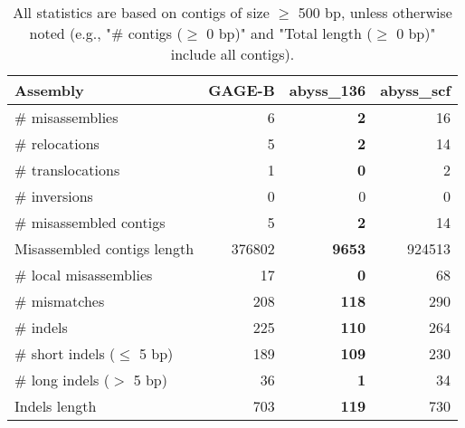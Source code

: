 \documentclass[12pt,a4paper]{article}
\begin{document}
\begin{table}[ht]
\begin{center}
\caption{All statistics are based on contigs of size $\geq$ 500 bp, unless otherwise noted (e.g., "\# contigs ($\geq$ 0 bp)" and "Total length ($\geq$ 0 bp)" include all contigs).}
\begin{tabular}{|l*{3}{|r}|}
\hline
Assembly & GAGE-B & abyss\_136 & abyss\_scf \\ \hline
\# misassemblies & 6 & {\bf 2} & 16 \\ \hline
\hspace{5mm}\# relocations & 5 & {\bf 2} & 14 \\ \hline
\hspace{5mm}\# translocations & 1 & {\bf 0} & 2 \\ \hline
\hspace{5mm}\# inversions & 0 & 0 & 0 \\ \hline
\# misassembled contigs & 5 & {\bf 2} & 14 \\ \hline
Misassembled contigs length & 376802 & {\bf 9653} & 924513 \\ \hline
\# local misassemblies & 17 & {\bf 0} & 68 \\ \hline
\# mismatches & 208 & {\bf 118} & 290 \\ \hline
\# indels & 225 & {\bf 110} & 264 \\ \hline
\hspace{5mm}\# short indels ($\leq$ 5 bp) & 189 & {\bf 109} & 230 \\ \hline
\hspace{5mm}\# long indels ($>$ 5 bp) & 36 & {\bf 1} & 34 \\ \hline
Indels length & 703 & {\bf 119} & 730 \\ \hline
\end{tabular}
\end{center}
\end{table}
\end{document}
